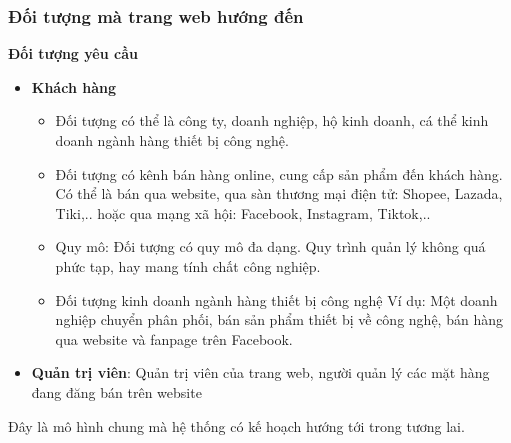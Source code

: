 \subsubsection*{Đối tượng mà trang web hướng đến}
\textbf{Đối tượng yêu cầu}
\begin{itemize}
    \item \textbf{Khách hàng}
    \begin{itemize}
        \item Đối tượng có thể là công ty, doanh nghiệp, hộ kinh doanh, cá thể kinh doanh ngành hàng thiết bị công nghệ.
        \item Đối tượng có kênh bán hàng online, cung cấp sản phẩm đến khách hàng. Có thể là bán qua website, qua sàn thương mại điện tử: Shopee, Lazada, Tiki,.. hoặc qua mạng xã hội: Facebook, Instagram, Tiktok,..
        \item Quy mô: Đối tượng có quy mô đa dạng. Quy trình quản lý không quá phức tạp, hay mang tính chất công nghiệp.
        \item Đối tượng kinh doanh ngành hàng thiết bị công nghệ Ví dụ: Một doanh nghiệp chuyển phân phối, bán sản phẩm thiết bị về công nghệ, bán hàng qua website và fanpage trên Facebook.
    \end{itemize}
    \item \textbf{Quản trị viên}: Quản trị viên của trang web, người quản lý các mặt hàng đang đăng bán trên website
\end{itemize}
  Đây là mô hình chung mà hệ thống có kế hoạch hướng tới trong tương lai.

